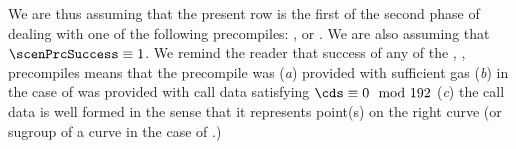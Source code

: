 \begin{center}
\end{center}
We are thus assuming that the present row is the first of the second phase of dealing with one of the following precompiles: \instEcadd{}, \instEcmul{} or \instEcpairing{}.
We are also assuming that $\scenPrcSuccess \equiv 1$.
We remind the reader that success of any of the \instEcadd{}, \instEcmul{}, \instEcpairing{} precompiles means that the precompile was
(\emph{a}) provided with sufficient gas
(\emph{b}) in the case of \instEcpairing{} was provided with call data satisfying $\cds \equiv 0 \mod 192$
(\emph{c}) the call data is well formed in the sense that it represents point(s) on the right curve (or sugroup of a curve in the case of \instEcpairing{}.)
